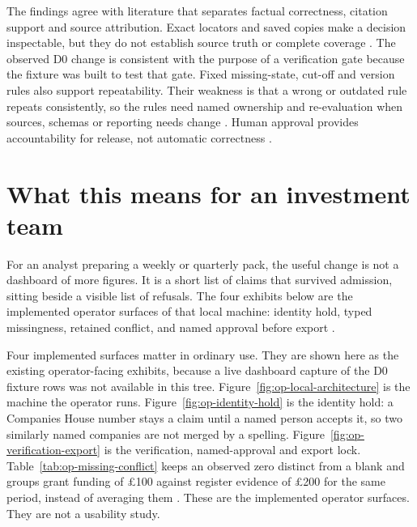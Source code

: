 The findings agree with literature that separates factual correctness, citation support and source
attribution. Exact locators and saved copies make a decision inspectable, but they do not establish
source truth or complete coverage \citep{gao2023alce,gao2023rarr}. The observed D0 change is
consistent with the purpose of a verification gate because the fixture was built to test that gate.
Fixed missing-state, cut-off and version rules also support repeatability. Their weakness is that a
wrong or outdated rule repeats consistently, so the rules need named ownership and re-evaluation when
sources, schemas or reporting needs change
\citep{pineau2021reproducibility,nikiforova2020quality,gebru2021datasheets}. Human approval provides
accountability for release, not automatic correctness
\citep{amershi2019guidelines,bucinca2021forcing}.

\section{What this means for an investment team}

For an analyst preparing a weekly or quarterly pack, the useful change is not a dashboard of more
figures. It is a short list of claims that survived admission, sitting beside a visible list of
refusals. The four exhibits below are the implemented operator surfaces of that local machine:
identity hold, typed missingness, retained conflict, and named approval before export
\citep{amershi2019guidelines,nist2023airmf}.

Four implemented surfaces matter in ordinary use. They are shown here as the existing
operator-facing exhibits, because a live dashboard capture of the D0 fixture rows was not
available in this tree. Figure~\ref{fig:op-local-architecture} is the machine the operator
runs. Figure~\ref{fig:op-identity-hold} is the identity hold: a Companies House number stays a
claim until a named person accepts it, so two similarly named companies are not merged by a
spelling. Figure~\ref{fig:op-verification-export} is the verification, named-approval and
export lock. Table~\ref{tab:op-missing-conflict} keeps an observed zero distinct from a blank
and groups grant funding of \pounds100 against register evidence of \pounds200 for the same
period, instead of averaging them \citep{bradley2024synfintabs,gao2023alce}. These are the
implemented operator surfaces. They are not a usability study.



